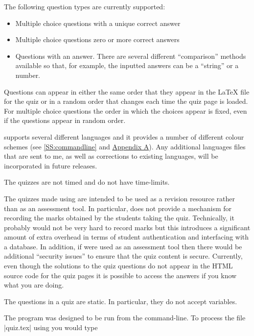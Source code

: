 \documentclass[svgnames]{article}
\begin{document}
    The following question types are currently supported:
    \begin{itemize}
      \item Multiple choice questions with a unique correct answer
      \item Multiple choice questions zero or more correct answers
      \item Questions with an answer. There are several different
      ``comparison'' methods available so that, for example, the
      inputted answers can be a ``string'' or a number.
    \end{itemize}

    Questions can appear in either the same order that they appear in
    the \LaTeX{} file for the quiz or in a random order that changes
    each time the quiz page is loaded. For multiple choice questions the
    order in which the choices appear is fixed, even if the questions
    appear in random order.

    \WebQuiz supports several different languages and it
    provides a number of different colour schemes (see
    \autoref{SS:commandline} and \hyperref[SS:themes]{Appendix A}). Any additional
    languages files that are sent to me, as well as corrections to
    existing languages, will be incorporated in future releases.

    The quizzes are not timed and do not have time-limits.

    The quizzes made using \WebQuiz are intended to be used as a
    revision resource rather than as an assessment tool. In particular,
    \WebQuiz does not provide a mechanism for recording the marks
    obtained by the students taking the quiz. Technically, it probably
    would not be very hard to record marks but this introduces a
    significant amount of extra overhead in terms of student
    authentication and interfacing with a database. In addition, if
    \WebQuiz were used as an assessment tool then there would be
    additional ``security issues'' to ensure that the quiz content is
    secure. Currently, even though the solutions to the quiz questions
    do not appear in the HTML source code for the quiz pages it is
    possible to access the answers if you know what you are doing.

    The questions in a \WebQuiz quiz are static. In particular, they do
    not accept variables.

    The \WebQuiz program was designed to be run from the command-line.
    To process the file \BashCode|quiz.tex| using \WebQuiz you would
    type
\end{document}
